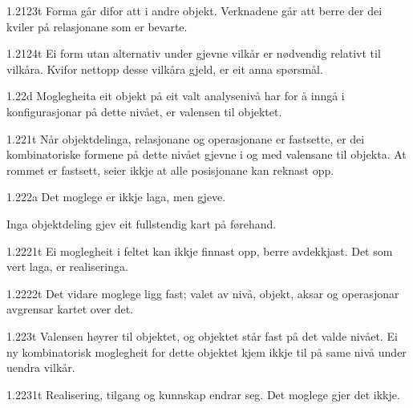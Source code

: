\begin{formproposition}{1.2123}{t}
Forma går difor att i andre objekt. Verknadene går att berre der dei kviler på relasjonane som er bevarte.
\end{formproposition}

\begin{formproposition}{1.2124}{t}
Ei form utan alternativ under gjevne vilkår er nødvendig relativt til vilkåra. Kvifor nettopp desse vilkåra gjeld, er eit anna spørsmål.
\end{formproposition}

\begin{formproposition}{1.22}{d}
Moglegheita eit objekt på eit valt analysenivå har for å inngå i konfigurasjonar på dette nivået, er valensen til objektet.
\end{formproposition}

\begin{formproposition}{1.221}{t}
Når objektdelinga, relasjonane og operasjonane er fastsette, er dei kombinatoriske formene på dette nivået gjevne i og med valensane til objekta. At rommet er fastsett, seier ikkje at alle posisjonane kan reknast opp.
\end{formproposition}

\begin{formproposition}{1.222}{a}
Det moglege er ikkje laga, men gjeve.

Inga objektdeling gjev eit fullstendig kart på førehand.
\end{formproposition}

\begin{formproposition}{1.2221}{t}
Ei moglegheit i feltet kan ikkje finnast opp, berre avdekkjast. Det som vert laga, er realiseringa.
\end{formproposition}

\begin{formproposition}{1.2222}{t}
Det vidare moglege ligg fast; valet av nivå, objekt, aksar og operasjonar avgrensar kartet over det.
\end{formproposition}

\begin{formproposition}{1.223}{t}
Valensen høyrer til objektet, og objektet står fast på det valde nivået. Ei ny kombinatorisk moglegheit for dette objektet kjem ikkje til på same nivå under uendra vilkår.
\end{formproposition}

\begin{formproposition}{1.2231}{t}
Realisering, tilgang og kunnskap endrar seg. Det moglege gjer det ikkje.
\end{formproposition}

